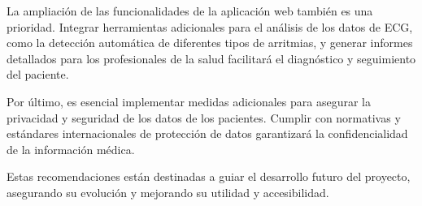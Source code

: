 La ampliación de las funcionalidades de la aplicación web también es una prioridad. Integrar herramientas adicionales para el análisis de los datos de ECG, como la detección automática de diferentes tipos de arritmias, y generar informes detallados para los profesionales de la salud facilitará el diagnóstico y seguimiento del paciente.


Por último, es esencial implementar medidas adicionales para asegurar la privacidad y seguridad de los datos de los pacientes. Cumplir con normativas y estándares internacionales de protección de datos garantizará la confidencialidad de la información médica.

Estas recomendaciones están destinadas a guiar el desarrollo futuro del proyecto, asegurando su evolución y mejorando su utilidad y accesibilidad.





